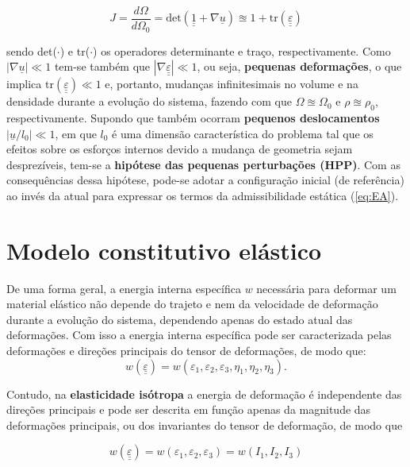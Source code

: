 \begin{equation}
	\label{eq:jacobiano}
	J = \frac{d\Omega}{d\Omega_0} = \text{det}\left(\underline{\underline 1} + \nabla \underline u \right) \approxeq 1 + \text{tr}(\underline{\underline \varepsilon})
\end{equation}

sendo det($\cdot$) e tr($\cdot$) os operadores determinante e traço, respectivamente. Como  $\left| \nabla \underline u \right| \ll 1$ tem-se também que $\left| \nabla \underline {\underline \varepsilon} \right| \ll 1$, ou seja, \textbf{pequenas deformações}, o que implica $\text{tr}(\underline{\underline \varepsilon}) \ll 1$ e, portanto, mudanças infinitesimais no volume e na densidade durante a evolução do sistema, fazendo com que $\Omega \approxeq \Omega_0$ e $\rho \approxeq \rho_0$, respectivamente. Supondo que também ocorram \textbf{pequenos deslocamentos} $\left| \underline u / l_0 \right| \ll 1$, em que $l_0$ é uma dimensão característica do problema tal que os efeitos sobre os esforços internos devido a mudança de geometria sejam desprezíveis, tem-se a \textbf{hipótese das pequenas perturbações (HPP)}. Com as consequências dessa hipótese, pode-se adotar a configuração inicial (de referência) ao invés da atual para expressar os termos da admissibilidade estática  (\ref{eq:EA}).

\section{Modelo constitutivo elástico}

De uma forma geral, a energia interna específica $w$  necessária para deformar um material elástico não depende do trajeto e nem da velocidade de deformação durante a evolução do sistema, dependendo apenas do estado atual das deformações. Com isso a energia interna específica pode ser caracterizada pelas deformações e direções principais do tensor de deformações, de modo que:
\begin{equation}
	\label{eq:energia_interna_elastica}
	w(\underline {\underline \varepsilon}) = w(\varepsilon_1,\varepsilon_2,\varepsilon_3,\eta_1,\eta_2,\eta_3).
\end{equation}

Contudo, na \textbf{elasticidade isótropa} a energia de deformação é independente das direções principais e pode ser descrita em função apenas da magnitude das deformações principais, ou dos invariantes do tensor de deformação, de modo que

\begin{equation}
	\label{eq:energia_interna_elastica_isotropa}
	w(\underline {\underline \varepsilon}) = w(\varepsilon_1,\varepsilon_2,\varepsilon_3) = w(I_1,I_2,I_3)
\end{equation}

